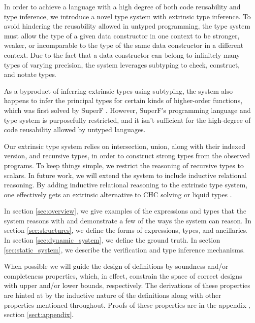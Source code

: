 \documentclass[acmsmall]{acmart}
\theoremstyle{definition}
\begin{document}

In order to achieve a language with a high degree of both code reusability and type inference, 
we introduce a novel type system with extrinsic type inference. 
To avoid hindering the reusability allowed in untyped programming, 
the type system must allow the type of a given data constructor in one context
to be stronger, weaker, or incomparable to the type of 
the same data constructor in a different context. 
Due to the fact that a data constructor can belong to infinitely many types of varying precision,
the system leverages subtyping to check, construct, and notate types.

As a byproduct of inferring extrinsic types using subtyping, the system also happens to infer the principal types for 
certain kinds of higher-order functions, which was first solved by SuperF \cite{}. 
However, SuperF's programming language and type system is purposefully 
restricted, and it isn't sufficient for the high-degree of code reusability allowed by untyped languages.

Our extrinsic type system relies on intersection, union, along with their indexed version, and recursive types, in order 
to construct strong types from the observed programs. 
To keep things simple, we restrict the reasoning of recursive types to scalars. In future work, 
we will extend the system to include inductive relational reasoning. By adding inductive relational
reasoning to the extrinsic type system, one effectively gets an extrinsic alternative to CHC solving \cite{} 
or liquid types \cite{}.


In section \ref{sec:overview}, we give examples of the expressions and types that the system reasons with
and demonstrate a few of the ways the system can reason. 
In section \ref{sec:structures}, we define the forms of expressions, types, and ancillaries. 
In section \ref{sec:dynamic_system}, we define the ground truth.
In section \ref{sec:static_system}, we describe the verification and type inference mechanisms.

When possible we will guide the design of definitions by soundness and/or completeness properties,
which, in effect, constrain the space of correct designs with upper and/or lower bounds, respectively. 
The derivations of these properties are hinted at by the inductive nature of the definitions 
along with other properties mentioned throughout.
Proofs of these properties are in the appendix , section \ref{sect:appendix}.
\end{document}
